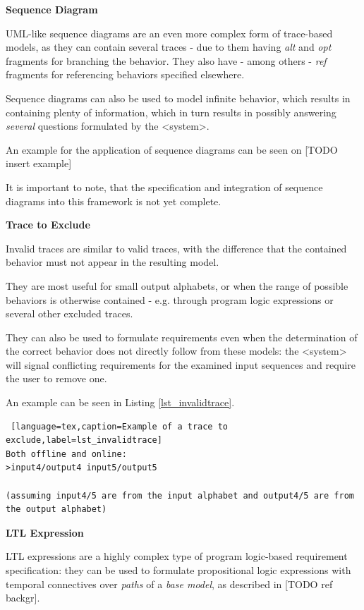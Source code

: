 \textbf{Sequence Diagram}

UML-like sequence diagrams are an even more complex form of trace-based models, as they can contain several traces - due to them having \textit{alt} and \textit{opt} fragments for branching the behavior. They also have - among others - \textit{ref} fragments for referencing behaviors specified elsewhere.

Sequence diagrams can also be used to model infinite behavior, which results in containing plenty of information, which in turn results in possibly answering \textit{several} questions formulated by the <system>.

An example for the application of sequence diagrams can be seen on [TODO insert example]

It is important to note, that the specification and integration of sequence diagrams into this framework is not yet complete. 

\textbf{Trace to Exclude}

Invalid traces are similar to valid traces, with the difference that the contained behavior must not appear in the resulting model. 

They are most useful for small output alphabets, or when the range of possible behaviors is otherwise contained - e.g. through program logic expressions or several other excluded traces.

They can also be used to formulate requirements even when the determination of the correct behavior does not directly follow from these models: the <system> will signal conflicting requirements for the examined input sequences and require the user to remove one.

An example can be seen in Listing \ref{lst_invalidtrace}.

\bigskip
\begin{lstlisting} [language=tex,caption=Example of a trace to exclude,label=lst_invalidtrace]
Both offline and online:
>input4/output4 input5/output5

(assuming input4/5 are from the input alphabet and output4/5 are from the output alphabet) 
\end{lstlisting}

\textbf{LTL Expression}

LTL expressions are a highly complex type of program logic-based requirement specification: they can be used to formulate propositional logic expressions with temporal connectives over \textit{paths} of a \textit{base model}, as described in [TODO ref backgr]. 

